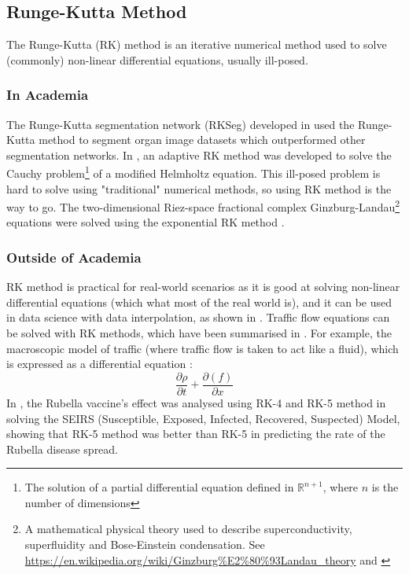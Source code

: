 \documentclass[a4paper, 10pt, conference]{ieeeconf}      %
\begin{document}
\subsection{Runge-Kutta Method} %
The Runge-Kutta (RK) method is an iterative numerical method used to solve (commonly) non-linear differential equations, usually ill-posed. 
\\
\subsubsection{In Academia} %
The Runge-Kutta segmentation network (RKSeg) developed in \cite{Zhu2023} used the Runge-Kutta method to segment organ image datasets which outperformed other segmentation networks. In \cite{Jday2023}, an adaptive RK method was developed to solve the Cauchy problem\footnote{The solution of a partial differential equation defined in $\mathbb{R}^{n+1}$, where $n$ is the number of dimensions} of a modified Helmholtz equation. This ill-posed problem is hard to solve using "traditional" numerical methods, so using RK method is the way to go. The two-dimensional Riez-space fractional complex Ginzburg-Landau\footnote{A mathematical physical theory used to describe superconductivity, superfluidity and Bose-Einstein condensation. See \url{https://en.wikipedia.org/wiki/Ginzburg\%E2\%80\%93Landau_theory} and \cite{Aranson2002}} equations \cite{Wang2018} were solved using the exponential RK method \cite{Hochbruck2005}\cite{Hochbruck2010}.
\\
\subsubsection{Outside of Academia} %
RK method is practical for real-world scenarios as it is good at solving non-linear differential equations (which what most of the real world is), and it can be used in data science with data interpolation, as shown in \cite{Karim2018}. Traffic flow equations can be solved with RK methods, which have been summarised in \cite{Naja2022}. For example, the macroscopic model of traffic (where traffic flow is taken to act like a fluid), which is expressed as a differential equation \cite{Lighthill1955}\cite{Nagatani2002}: 
\begin{equation}
    \frac{\partial{\rho}}{\partial{t}} + \frac{\partial(f)}{\partial{x}}
\end{equation}
In \cite{Asri2021}, the Rubella vaccine's effect was analysed using RK-4 and RK-5 method in solving the SEIRS (Susceptible, Exposed, Infected, Recovered, Suspected) Model, showing that RK-5 method was better than RK-5 in predicting the rate of the Rubella disease spread. 
\\
\end{document}
